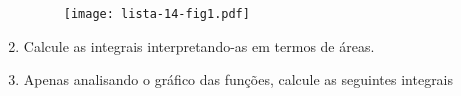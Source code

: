 \documentclass[a4paper,5pt]{amsbook}
\begin{document}
\begin{enumerate}
    \begin{figure}[h]
    	\centering
    	\texttt{[image: lista-14-fig1.pdf]}
    \end{figure}
    
    \vspace{0.5cm}
    \item Calcule as integrais interpretando-as em termos de \'areas.

    
    \vspace{0.5cm}
    \item Apenas analisando o gr\'afico das fun\c{c}\~oes, calcule as seguintes integrais

\end{enumerate}
\end{document}
